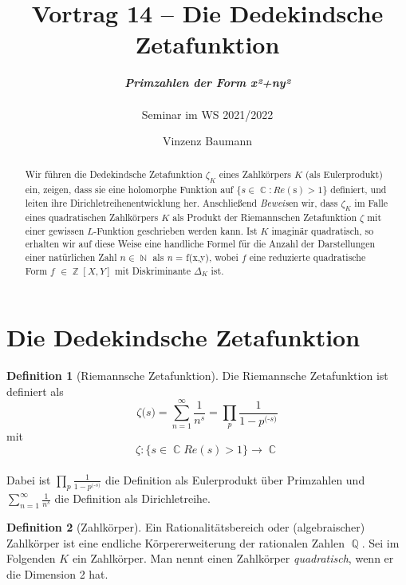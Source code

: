 \documentclass[10pt,a4paper]{article}
\title{\textbf{Vortrag 14} \textbf{-- Die Dedekindsche Zetafunktion}}
\author{ \textit{\textbf{Primzahlen der Form x²+ny²}} \\ \\Seminar im WS 2021/2022}
\date{Vinzenz Baumann}
\theoremstyle{plain}
\theoremstyle{definition}
\newtheorem{defn}{Definition}[section]
\theoremstyle{remark}
\DeclareMathOperator{\C}{\mathbb{C}}
\DeclareMathOperator{\Q}{\mathbb{Q}}
\DeclareMathOperator{\Z}{\mathbb{Z}}
\DeclareMathOperator{\N}{\mathbb{N}}
\begin{document}
\maketitle

\begin{abstract}

Wir führen die Dedekindsche Zetafunktion $\zeta_{\textit{K}}$ eines Zahlkörpers $\textit{K}$ (als Eulerprodukt) ein, zeigen, dass sie eine holomorphe Funktion auf  $\{\textit{s}  \in  \C: Re(\text{s})  >  1  \} $ definiert, und leiten ihre Dirichletreihenentwicklung her. Anschließend \textit{Beweis}en wir, dass $\zeta_{\textit{K}}$ im Falle eines quadratischen Zahlkörpers  $\textit{K}$ als Produkt der Riemannschen Zetafunktion $\zeta$ mit einer gewissen $\textit{L}$-Funktion geschrieben werden kann.
Ist $\textit{K}$ imaginär quadratisch, so erhalten wir auf diese Weise eine handliche Formel für die Anzahl der Darstellungen einer natürlichen Zahl $\textit{n} \in \N$ als \textit{n} = f(x,y), wobei $f$ eine reduzierte quadratische Form $f$ $\in \Z[X,Y]$ mit Diskriminante $\Delta_\textit{K}$ ist.

\end{abstract}

\section{Die Dedekindsche Zetafunktion}

\begin{defn}[Riemannsche Zetafunktion]

Die Riemannsche Zetafunktion ist definiert als  $$\zeta \textit{(s)}= \sum_{n = 1}^\infty  \frac{1}{n^s} =  \prod_{\textit{p}} \frac{1}{1-\textit{p}^\textit{(-s)}} $$ mit  $$ \zeta : \{\textit{s} \in \C Re(\textit{s}) > 1\}\rightarrow \C$$ \\
Dabei ist $\prod_{\textit{p}} \frac{1}{1-\textit{p}^\textit{(-s)}}$ die Definition als Eulerprodukt über Primzahlen und $\sum_{n = 1}^\infty  \frac{1}{n^s} $ die Definition als Dirichletreihe.

\end{defn}


\begin{defn}[Zahlkörper]

Ein Rationalitätsbereich oder (algebraischer) Zahlkörper ist eine endliche Körpererweiterung der rationalen Zahlen $\Q$.
Sei im Folgenden $\textit{K}$ ein Zahlkörper. Man nennt einen Zahlkörper \textit{quadratisch}, wenn er die Dimension 2 hat. 

\end{defn}
\end{document}
